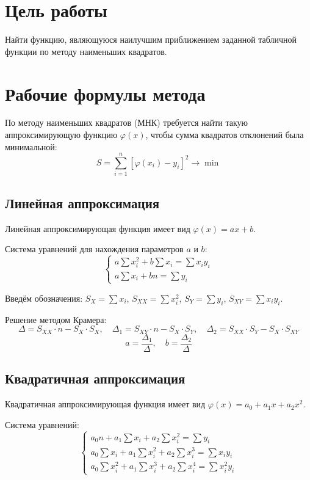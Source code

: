 \section{Цель работы}

Найти функцию, являющуюся наилучшим приближением заданной табличной функции по методу наименьших квадратов.

\section{Рабочие формулы метода}

По методу наименьших квадратов (МНК) требуется найти такую аппроксимирующую функцию $\varphi(x)$, чтобы сумма квадратов отклонений была минимальной:
\[
S = \sum_{i=1}^{n} [\varphi(x_i) - y_i]^2 \to \min
\]

\subsection{Линейная аппроксимация}

Линейная аппроксимирующая функция имеет вид $\varphi(x) = ax + b$.

Система уравнений для нахождения параметров $a$ и $b$:
\[
\begin{cases}
a \sum x_i^2 + b \sum x_i = \sum x_i y_i \\
a \sum x_i + b n = \sum y_i
\end{cases}
\]

Введём обозначения: $S_X = \sum x_i$, $S_{XX} = \sum x_i^2$, $S_Y = \sum y_i$, $S_{XY} = \sum x_i y_i$.

Решение методом Крамера:
\[
\Delta = S_{XX} \cdot n - S_X \cdot S_X,\quad
\Delta_1 = S_{XY} \cdot n - S_X \cdot S_Y,\quad
\Delta_2 = S_{XX} \cdot S_Y - S_X \cdot S_{XY}
\]
\[
a = \frac{\Delta_1}{\Delta},\quad b = \frac{\Delta_2}{\Delta}
\]

\subsection{Квадратичная аппроксимация}

Квадратичная аппроксимирующая функция имеет вид $\varphi(x) = a_0 + a_1 x + a_2 x^2$.

Система уравнений:
\[
\begin{cases}
a_0 n + a_1 \sum x_i + a_2 \sum x_i^2 = \sum y_i \\
a_0 \sum x_i + a_1 \sum x_i^2 + a_2 \sum x_i^3 = \sum x_i y_i \\
a_0 \sum x_i^2 + a_1 \sum x_i^3 + a_2 \sum x_i^4 = \sum x_i^2 y_i
\end{cases}
\]

